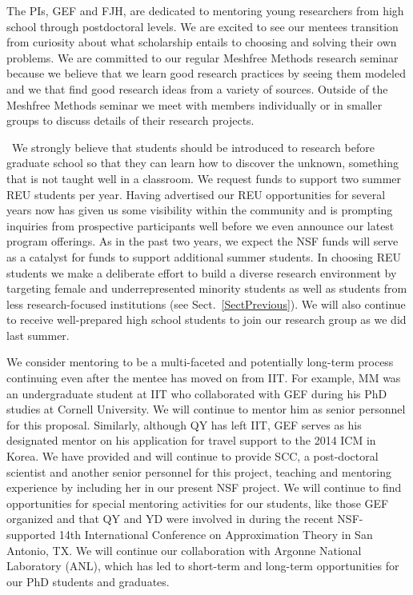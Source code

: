 \documentclass[11pt]{NSFamsart}
\begin{document}
The PIs, GEF and FJH, are dedicated to mentoring young researchers from high school through postdoctoral levels.  We are excited to see our mentees transition from curiosity about what scholarship entails to choosing and solving their own problems.  We are committed to our regular Meshfree Methods research seminar because we believe that we learn good research practices by seeing them modeled and we that find good research ideas from a variety of sources. Outside of the Meshfree Methods seminar we meet with members individually or in smaller groups to discuss details of their research projects.

\begin{description}[leftmargin=2.5ex]
\item[Providing Research Experiences for Undergraduates and High School Students]\ We \linebreak[4] strongly believe that students should be introduced to research before graduate school so that they can learn how to discover the unknown, something that is not taught well in a classroom. We request funds to support two summer REU students per year. Having advertised our REU opportunities for several years now has given us some visibility within the community and is prompting inquiries from prospective participants well before we even announce our latest program offerings. As in the past two years, we expect the NSF funds will serve as a catalyst for funds to support additional summer students. In choosing REU students we make a deliberate effort to build a diverse research environment by targeting female and underrepresented minority students as well as students from less research-focused institutions (see Sect.~\ref{SectPrevious}). We will also continue to receive well-prepared high school students to join our research group as we did last summer.

\item[Preparing Students for Academic Careers] We consider mentoring to be a multi-faceted and potentially long-term process continuing even after the mentee has moved on from IIT.  For example, MM was an undergraduate student at IIT who collaborated with GEF during his PhD studies at Cornell University.  We will continue to mentor him as senior personnel for this proposal. Similarly, although QY has left IIT, GEF serves as his designated mentor on his application for travel support to the 2014 ICM in Korea. We have provided and will continue to provide SCC, a post-doctoral scientist and another senior personnel for this project, teaching and mentoring experience by including her in our present NSF project.  We will continue to find opportunities for special mentoring activities for our students, like those GEF organized and that QY and YD were involved in during the recent NSF-supported 14th International Conference on Approximation Theory in San Antonio, TX.  We  will continue our collaboration with Argonne National Laboratory (ANL), which has led to short-term and long-term opportunities for our PhD students and graduates.


\end{description}
\end{document}
